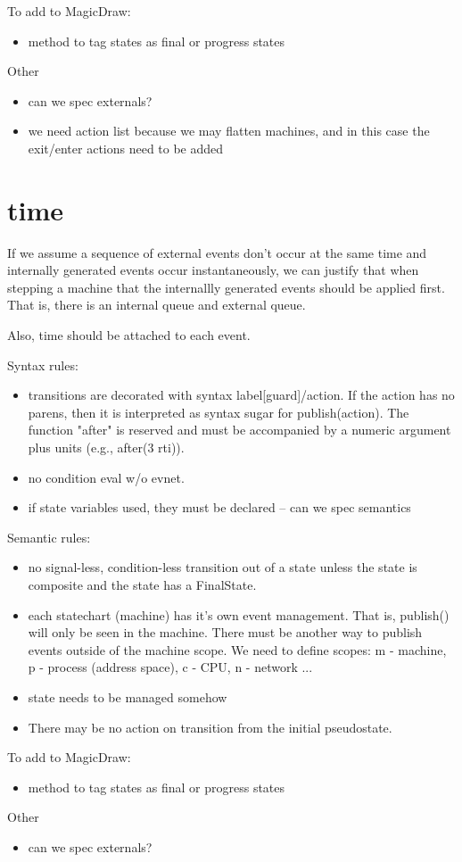 \documentclass{article}
\begin{document}
To add to MagicDraw:
\begin{itemize}
\item
method to tag states as final or progress states
\end{itemize}


Other
\begin{itemize}
\item
can we spec externals?
\item
we need action list because we may flatten machines, and in this case
the exit/enter actions need to be added
\end{itemize}

\section{time}

If we assume a sequence of external events don't occur at the same time
and internally generated events occur instantaneously, we can justify that
when stepping a machine that the internallly generated events should be
applied first.  That is, there is an internal queue and external queue.

Also, time should be attached to each event.



Syntax rules:
\begin{itemize}
\item 
transitions are decorated with syntax label[guard]/action.
If the action has no parens, then it is interpreted as syntax
sugar for publish(action).  The function "after" is reserved
and must be accompanied by a numeric argument plus units
(e.g., after(3 rti)).
\item
no condition eval w/o evnet.
\item
if state variables used, they must be declared -- can we spec semantics
\end{itemize}

Semantic rules:
\begin{itemize}
\item
no signal-less, condition-less transition out of a state unless the
state is composite and the state has a FinalState.
\item
each statechart (machine) has it's own event management.  That is,
publish() will only be seen in the machine.  There must be another
way to publish events outside of the machine scope.  We need to 
define scopes: m - machine, p - process (address space), c - CPU,
n - network ...
\item
state needs to be managed somehow
\item
There may be no action on transition from the initial pseudostate.
\end{itemize}


To add to MagicDraw:
\begin{itemize}
\item
method to tag states as final or progress states
\end{itemize}


Other
\begin{itemize}
\item
can we spec externals?
\end{itemize}
\end{document}
